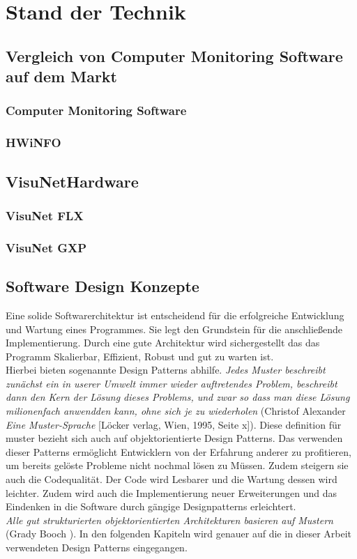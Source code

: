 \chapter{Stand der Technik}

\section{Vergleich von Computer Monitoring Software auf dem Markt}
\subsection{Computer Monitoring Software}
\subsection{HWiNFO}

\section{VisuNetHardware}
\subsection{VisuNet FLX}
\subsection{VisuNet GXP}

\newpage

\section{Software Design Konzepte}
Eine solide Softwarerchitektur ist entscheidend für die erfolgreiche Entwicklung und Wartung eines Programmes. Sie legt den Grundstein für die anschließende Implementierung. Durch eine gute Architektur wird sichergestellt das das Programm Skalierbar, Effizient, Robust und gut zu warten ist.\\
Hierbei bieten sogenannte Design Patterns abhilfe. \textit{Jedes Muster beschreibt zunächst ein in userer Umwelt immer wieder auftretendes Problem, beschreibt dann den Kern der Lösung dieses Problems, und zwar so dass man diese Lösung milionenfach anwendden kann, ohne sich je zu wiederholen} (Christof Alexander \textit{Eine Muster-Sprache} [Löcker verlag, Wien, 1995, Seite x]). Diese definition für muster bezieht sich auch auf objektorientierte Design Patterns. Das verwenden dieser Patterns ermöglicht Entwicklern von der Erfahrung anderer zu profitieren, um bereits gelöste Probleme nicht nochmal lösen zu Müssen. Zudem steigern sie auch die Codequalität. Der Code wird Lesbarer und die Wartung dessen wird leichter. Zudem wird auch die Implementierung neuer Erweiterungen und das Eindenken in die Software durch gängige Designpatterns erleichtert. \cite[S.25 ff]{DesignPatterns}\\
\textit{Alle gut strukturierten objektorientierten Architekturen basieren auf Mustern} (Grady Booch \cite[S.21]{DesignPatterns}).
In den folgenden Kapiteln wird genauer auf die in dieser Arbeit verwendeten Design Patterns eingegangen.      

